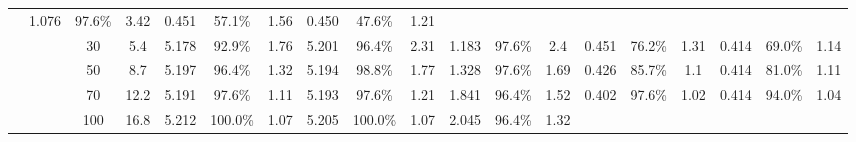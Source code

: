 \documentclass[letterpaper]{article}
\begin{document}
\begin{table*}[]
\begin{tabular}{|c|c|cc|ccc|ccc|ccc|ccc|ccc|}
		& 1.076 & 97.6\% & 3.42 	 

		& 0.451 & 57.1\% & 1.56 	 

		& 0.450 & 47.6\% & 1.21 	 

	\\ & & 30	 & 5.4

		& 5.178 & 92.9\% & 1.76 	 

		& 5.201 & 96.4\% & 2.31 	 

		& 1.183 & 97.6\% & 2.4 	 

		& 0.451 & 76.2\% & 1.31 	 

		& 0.414 & 69.0\% & 1.14 	 

	\\ & & 50	 & 8.7

		& 5.197 & 96.4\% & 1.32 	 

		& 5.194 & 98.8\% & 1.77 	 

		& 1.328 & 97.6\% & 1.69 	 

		& 0.426 & 85.7\% & 1.1 	 

		& 0.414 & 81.0\% & 1.11 	 

	\\ & & 70	 & 12.2

		& 5.191 & 97.6\% & 1.11 	 

		& 5.193 & 97.6\% & 1.21 	 

		& 1.841 & 96.4\% & 1.52 	 

		& 0.402 & 97.6\% & 1.02 	 

		& 0.414 & 94.0\% & 1.04 	 

	\\ & & 100	 & 16.8

		& 5.212 & 100.0\% & 1.07 	 

		& 5.205 & 100.0\% & 1.07 	 

		& 2.045 & 96.4\% & 1.32 	 


\end{tabular}
\end{table*}
\end{document}
